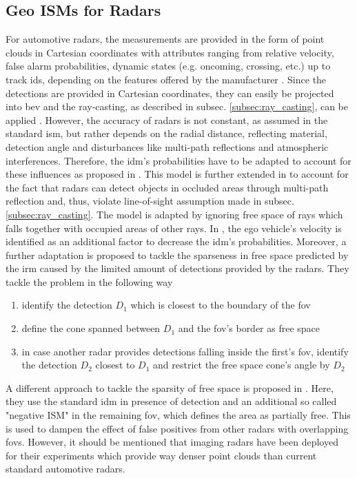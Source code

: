 \subsection{Geo ISMs for Radars}
\label{subsec:geo_ism_radar}
For automotive radars, the measurements are provided in the form of point clouds in Cartesian coordinates with attributes ranging from relative velocity, false alarm probabilities, dynamic states (e.g. oncoming, crossing, etc.) up to track ids, depending on the features offered by the manufacturer \cite{caesar2020nuscenes}. Since the detections are provided in Cartesian coordinates, they can easily be projected into \gls{bev} and the ray-casting, as described in subsec. \ref{subsec:ray_casting}, can be applied \cite{bouzouraa2010fusion,dube2014detection}. However, the accuracy of radars is not constant, as assumed in the standard \gls{ism}, but rather depends on the radial distance, reflecting material, detection angle and disturbances like multi-path reflections and atmospheric interferences. Therefore, the \gls{idm}'s probabilities have to be adapted to account for these influences as proposed in \cite{clarke2012sensor}. This model is further extended in \cite{werber2015automotive} to account for the fact that radars can detect objects in occluded areas through multi-path reflection and, thus, violate line-of-sight assumption made in subsec. \ref{subsec:ray_casting}. The model is adapted by ignoring free space of rays which falls together with occupied areas of other rays. In \cite{prophet2018adaptions}, the ego vehicle's velocity is identified as an additional factor to decrease the \gls{idm}'s probabilities. Moreover, a further adaptation is proposed to tackle the sparseness in free space predicted by the \gls{irm} caused by the limited amount of detections provided by the radars. They tackle the problem in the following way
\begin{enumerate}
	\item identify the detection $D_1$ which is closest to the boundary of the \gls{fov}
	\item define the cone spanned between $D_1$ and the \gls{fov}'s border as free space
	\item in case another radar provides detections falling inside the first's \gls{fov}, identify the detection $D_2$ closest to $D_1$ and restrict the free space cone's angle by $D_2$   
\end{enumerate}
A different approach to tackle the sparsity of free space is proposed in \cite{slutsky2019dual}. Here, they use the standard \gls{idm} in presence of detection and an additional so called "negative ISM" in the remaining \gls{fov}, which defines the area as partially free. This is used to dampen the effect of false positives from other radars with overlapping \gls{fov}s. However, it should be mentioned that imaging radars have been deployed for their experiments which provide way denser point clouds than current standard automotive radars.
%
